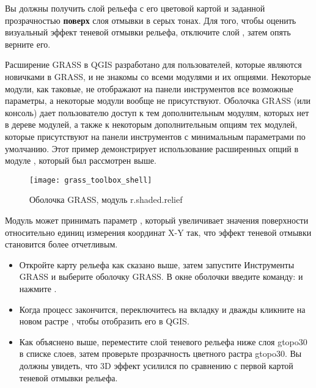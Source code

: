 Вы должны получить слой рельефа  с его цветовой
картой и заданной прозрачностью \textbf{поверх} слоя отмывки в серых
тонах. Для того, чтобы оценить визуальный эффект теневой отмывки
рельефа, отключите слой , затем опять верните
его.


Расширение GRASS в QGIS разработано для пользователей, которые являются
новичками в GRASS, и не знакомы со всеми модулями и их опциями. Некоторые
модули, как таковые, не отображают на панели инструментов все возможные
параметры, а некоторые модули вообще не присутствуют. Оболочка GRASS (или
консоль) дает пользователю доступ к тем дополнительным модулям, которых
нет в дереве модулей, а также к некоторым дополнительным опциям тех
модулей, которые присутствуют на панели инструментов с минимальным
параметрами по умолчанию. Этот пример демонстрирует использование
расширенных опций в модуле , который был
рассмотрен выше.

\begin{figure}[ht]
 \centering
 \texttt{[image: grass\_toolbox\_shell]}
 \caption{Оболочка GRASS, модуль r.shaded.relief \nixcaption}\label{fig:grass_toolbox_shell}
\end{figure}

Модуль  может принимать параметр
, который увеличивает значения поверхности относительно
единиц измерения координат X-Y так, что эффект теневой отмывки становится
более отчетливым.

\begin{itemize}[label=--]
\item Откройте карту рельефа  как сказано выше,
затем запустите Инструменты GRASS и выберите оболочку GRASS. В окне
оболочки введите команду:\linebreak
{} \linebreak и нажмите .
\end{itemize}

\begin{itemize}[label=--]
\item Когда процесс закончится, переключитесь на вкладку 
и дважды кликните на новом растре , чтобы
отобразить его в QGIS.
\item Как объяснено выше, переместите слой теневого рельефа ниже слоя
gtopo30 в списке слоев, затем проверьте прозрачность цветного растра
gtopo30. Вы должны увидеть, что 3D эффект усилился по сравнению с
первой картой теневой отмывки рельефа.
\end{itemize}

